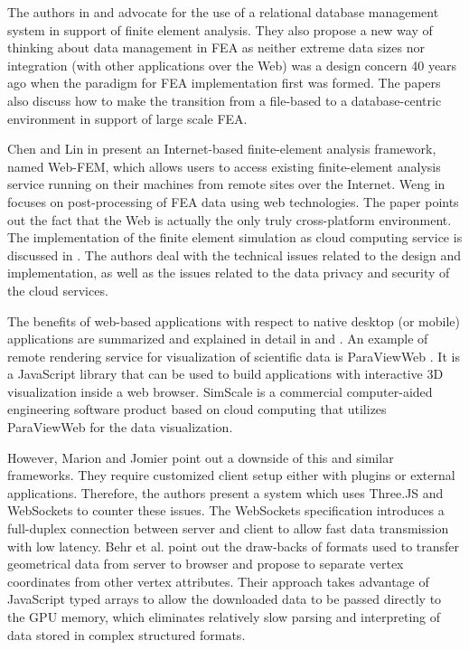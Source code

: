 The authors in \cite{Heber2007I} and \cite{Heber2007II} advocate for the use of a relational database management system in support of finite element analysis. They also propose a new way of thinking about data management in FEA as neither extreme data sizes nor integration (with other applications over the Web) was a design concern 40 years ago when the paradigm for FEA implementation first was formed. The papers also discuss how to make the transition from a file-based to a database-centric environment in support of large scale FEA.

Chen and Lin in \cite{Chen2008} present an Internet-based finite-element analysis framework, named Web-FEM, which allows users to access existing finite-element analysis service running on their machines from remote sites over the Internet. Weng in \cite{Weng2011} focuses on post-processing of FEA data using web technologies. The paper points out the fact that the Web is actually the only truly cross-platform environment. The implementation of the finite element simulation as cloud computing service is discussed in \cite{Ari2013}. The authors deal with the technical issues related to the design and implementation, as well as the issues related to the data privacy and security of the cloud services.

The benefits of web-based applications with respect to native desktop (or mobile) applications are summarized and explained in detail in \cite{Mouton2011} and \cite{Charland2011}. An example of remote rendering service for visualization of scientific data is ParaViewWeb \cite{Jourdain2011}. It is a JavaScript library that can be used to build applications with interactive 3D visualization inside a web browser. SimScale \cite{SimScale} is a commercial computer-aided engineering software product based on cloud computing that utilizes ParaViewWeb for the data visualization.

However, Marion and Jomier point out \cite{Marion2012} a downside of this and similar frameworks. They require customized client setup either with plugins or external applications. Therefore, the authors present a system which uses Three.JS and WebSockets to counter these issues. The WebSockets specification \cite{WebSockets} introduces a full-duplex connection between server and client to allow fast data transmission with low latency. Behr et al. \cite{Behr2012} point out the draw-backs of formats used to transfer geometrical data from server to browser and propose to separate vertex coordinates from other vertex attributes. Their approach takes advantage of JavaScript typed arrays to allow the downloaded data to be passed directly to the GPU memory, which eliminates relatively slow parsing and interpreting of data stored in complex structured formats.
